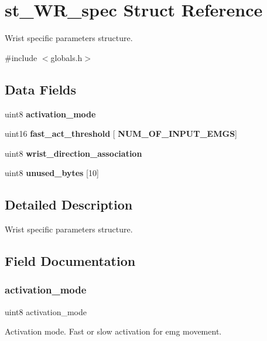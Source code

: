 \section{st\+\_\+\+W\+R\+\_\+spec Struct Reference}
\label{structst___w_r__spec}


Wrist specific parameters structure.  




{\ttfamily \#include $<$globals.\+h$>$}

\subsection*{Data Fields}
\begin{DoxyCompactItemize}
\item 
uint8 \textbf{ activation\+\_\+mode}
\item 
uint16 \textbf{ fast\+\_\+act\+\_\+threshold} [\textbf{ N\+U\+M\+\_\+\+O\+F\+\_\+\+I\+N\+P\+U\+T\+\_\+\+E\+M\+GS}]
\item 
uint8 \textbf{ wrist\+\_\+direction\+\_\+association}
\item 
uint8 \textbf{ unused\+\_\+bytes} [10]
\end{DoxyCompactItemize}


\subsection{Detailed Description}
Wrist specific parameters structure. 



\subsection{Field Documentation}
\mbox{\label{structst___w_r__spec_aae506161b08911ed250d3e5a9c425db9}} 
\subsubsection{activation\+\_\+mode}
{\footnotesize\ttfamily uint8 activation\+\_\+mode}

Activation mode. Fast or slow activation for emg movement. \mbox{\label{structst___w_r__spec_a85da13885337caa721e6d3d4b5ab7f06}} 
